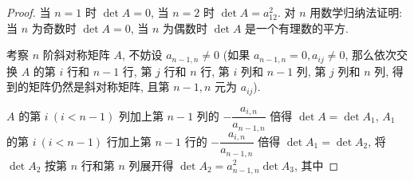 \documentclass[color=black,device=normal,lang=cn,mode=geye]{elegantnote}
\begin{document}
\begin{landscape}
\begin{proof}
    当 $n=1$ 时 $\det A=0$, 当 $n=2$ 时 $\det A=a_{12}^2$. 对 $n$ 用数学归纳法证明: 当 $n$ 为奇数时 $\det A=0$, 当 $n$ 为偶数时 $\det A$ 是一个有理数的平方.
    
    考察 $n$ 阶斜对称矩阵 $A$, 不妨设 $a_{n-1,n}\neq0$ (如果 $a_{n-1,n}=0,a_{ij}\neq0$, 那么依次交换 $A$ 的第 $i$ 行和 $n-1$ 行, 第 $j$ 行和 $n$ 行, 第 $i$ 列和 $n-1$ 列, 第 $j$ 列和 $n$ 列, 得到的矩阵仍然是斜对称矩阵, 且第 $n-1,n$ 元为 $a_{ij}$).
    
    $A$ 的第 $i\ (i<n-1)$ 列加上第 $n-1$ 列的 $-\dfrac{a_{i,n}}{a_{n-1,n}}$ 倍得 $\det A=\det A_1$, $A_1$ 的第 $i\ (i<n-1)$ 行加上第 $n-1$ 行的 $-\dfrac{a_{i,n}}{a_{n-1,n}}$ 倍得 $\det A_1=\det A_2$, 将 $\det A_2$ 按第 $n$ 行和第 $n$ 列展开得 $\det A_2=a_{n-1,n}^2\det A_3$, 其中
    

\end{proof}
\end{landscape}
\end{document}
